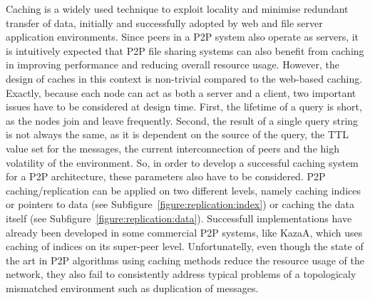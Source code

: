 Caching is a widely used technique to exploit locality and minimise redundant
transfer of data, initially and successfully adopted by web and file server
application environments. Since peers in a P2P system also operate as
servers, it is intuitively expected that P2P file sharing systems can also
benefit from caching in improving performance and reducing overall resource
usage. However, the design of caches in this context is non-trivial compared to
the web-based caching. Exactly, because each node can act as both a server and a
client, two important issues have to be considered at design time. First, the
lifetime of a query is short, as the nodes join and leave frequently. Second,
the result of a single query string is not always the same, as it is dependent
on the source of the query, the TTL value set for the messages, the current
interconnection of peers and the high volatility of the environment. So, in
order to develop a successful caching system for a P2P architecture, these
parameters also have to be considered. P2P caching/replication can be applied
on two different levels, namely caching indices or pointers to data (see
Subfigure~\ref{figure:replication:index}) or caching
the data itself (see
Subfigure~\ref{figure:replication:data}). Successfull implementations have
already been developed in some commercial P2P systems, like KazaA, which uses
caching of indices on its super-peer level. Unfortunatelly, even though the
state of the art in P2P algorithms using caching methods reduce the resource
usage of the network, they also fail to consistently address typical problems
of a topologicaly mismatched environment such as duplication of messages.

%

